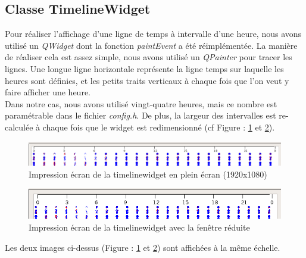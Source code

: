 \documentclass[12pt]{article}
\begin{document}
		\subsection{Classe TimelineWidget}
		Pour réaliser l’affichage d’une ligne de temps à intervalle d’une heure, nous avons utilisé un \textit{QWidget} dont la fonction \textit{paintEvent} a été réimplémentée. La manière de réaliser cela est assez simple, nous avons utilisé un \textit{QPainter} pour tracer les lignes. Une longue ligne horizontale représente la ligne temps sur laquelle les heures sont définies, et les petits traits verticaux à chaque fois que l’on veut y faire afficher une heure.\\
Dans notre cas, nous avons utilisé vingt-quatre heures, mais ce nombre est paramétrable dans le 
fichier \textit{config.h}. De plus, la largeur des intervalles est re-calculée à chaque fois que le widget est redimensionné
(cf Figure : \ref{fig:timeline_widget_1} et \ref{fig:timeline_widget_2}).


\clearpage
		\begin{figure}[!h]
		\begin{center}
		\includegraphics[scale=.4]{timeline_widget_1.png}
		\caption{Impression écran de la timelinewidget en plein écran (1920x1080)}
		\label{fig:timeline_widget_1}
		\end{center}
		\end{figure}
		
		\begin{figure}[!h]
		\begin{center}
		\includegraphics[scale=.4]{timeline_widget_2.png}
		\caption{Impression écran de la timelinewidget avec la fenêtre réduite}
		\label{fig:timeline_widget_2}
		\end{center}
		\end{figure}
		
		Les deux images ci-dessus (Figure : \ref{fig:timeline_widget_1} et \ref{fig:timeline_widget_2})
		sont affichées à la même échelle.
	
		
\end{document}
